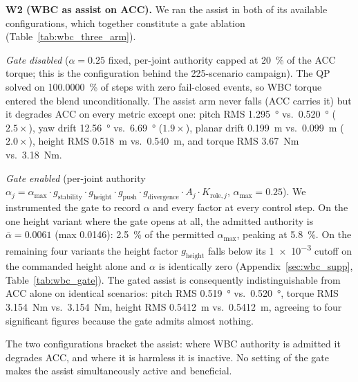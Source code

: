 \documentclass[conference]{IEEEtran}
\begin{document}
\medskip\noindent\textbf{W2 (WBC as assist on ACC).}
We ran the assist in both of its available configurations, which together constitute a gate ablation (Table~\ref{tab:wbc_three_arm}).

\emph{Gate disabled} ($\alpha{=}0.25$ fixed, per-joint authority capped at \SI{20}{\percent} of the ACC torque; this is the configuration behind the 225-scenario campaign). The QP solved on \SI{100.0000}{\percent} of steps with zero fail-closed events, so WBC torque entered the blend unconditionally. The assist arm never falls (ACC carries it) but it degrades ACC on every metric except one: pitch RMS \SI{1.295}{\degree} vs.\ \SI{0.520}{\degree} ($\num{2.5}\times$), yaw drift \SI{12.56}{\degree} vs.\ \SI{6.69}{\degree} ($\num{1.9}\times$), planar drift \SI{0.199}{m} vs.\ \SI{0.099}{m} ($\num{2.0}\times$), height RMS \SI{0.518}{m} vs.\ \SI{0.540}{m}, and torque RMS \SI{3.67}{Nm} vs.\ \SI{3.18}{Nm}.

\emph{Gate enabled} (per-joint authority $\alpha_{j} = \alpha_{\max}\!\cdot\!g_{\text{stability}}\!\cdot\!g_{\text{height}}\!\cdot\!g_{\text{push}}\!\cdot\!g_{\text{divergence}}\!\cdot\!A_j\!\cdot\!K_{\text{role},j}$, $\alpha_{\max}{=}0.25$). We instrumented the gate to record $\alpha$ and every factor at every control step. On the one height variant where the gate opens at all, the admitted authority is $\bar\alpha{=}\num{0.0061}$ (max \num{0.0146}): \SI{2.5}{\percent} of the permitted $\alpha_{\max}$, peaking at \SI{5.8}{\percent}. On the remaining four variants the height factor $g_{\text{height}}$ falls below its \num{1e-3} cutoff on the commanded height alone and $\alpha$ is identically zero (Appendix~\ref{sec:wbc_supp}, Table~\ref{tab:wbc_gate}). The gated assist is consequently indistinguishable from ACC alone on identical scenarios: pitch RMS \SI{0.519}{\degree} vs.\ \SI{0.520}{\degree}, torque RMS \SI{3.154}{Nm} vs.\ \SI{3.154}{Nm}, height RMS \SI{0.5412}{m} vs.\ \SI{0.5412}{m}, agreeing to four significant figures because the gate admits almost nothing.

The two configurations bracket the assist: where WBC authority is admitted it degrades ACC, and where it is harmless it is inactive. No setting of the gate makes the assist simultaneously active and beneficial.
\end{document}
